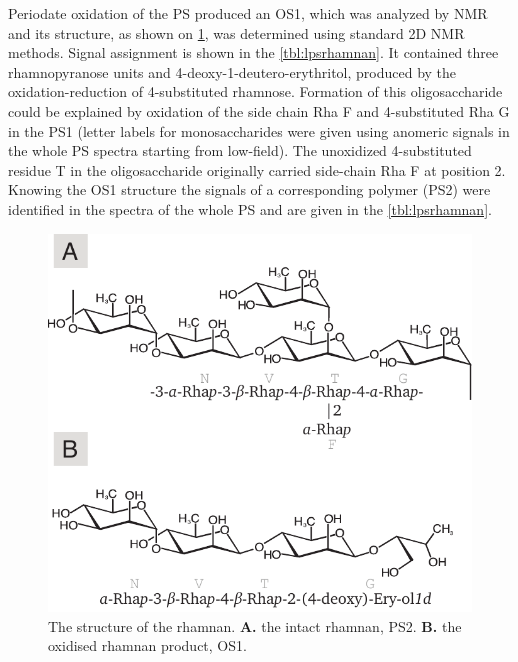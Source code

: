 Periodate oxidation of the \ac{PS} produced an \ac{OS}1, which was analyzed by \ac{NMR} and its
structure, as shown on \cref{fig:lpsrhamnan}, was determined using standard 2D \ac{NMR}
methods. Signal assignment is shown in the \cref{tbl:lpsrhamnan}. It contained three
rhamnopyranose units and 4-deoxy-1-deutero-erythritol, produced by the oxidation-reduction of
4-substituted rhamnose. Formation of this oligosaccharide could be explained by oxidation of the
side chain Rha F and 4-substituted Rha G in the \ac{PS}1 (letter labels for monosaccharides were
given using anomeric signals in the whole \ac{PS} spectra starting from low-field). The unoxidized
4-substituted residue T in the oligosaccharide originally carried side-chain Rha F at position
2. Knowing the \ac{OS}1 structure the signals of a corresponding polymer (\ac{PS}2) were
identified in the spectra of the whole \ac{PS} and are given in the \cref{tbl:lpsrhamnan}.

\begin{figure}[htb]
  \begin{center}
    \includegraphics[]{lps_chapter/img/lpsrhamnan.pdf}
  \end{center}
  \caption[The structure of the \caulobacter rhamnan.]{The structure of the \caulobacter rhamnan. \textbf{A.} the intact rhamnan, \ac{PS}2. \textbf{B.} the oxidised rhamnan product, \ac{OS}1.}
  \label{fig:lpsrhamnan}
\end{figure}

